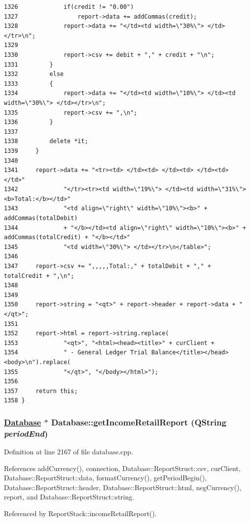 \begin{verbatim}
1326             if(credit != "0.00")
1327                 report->data += addCommas(credit);
1328             report->data += "</td><td width=\"30%\"> </td></tr>\n";
1329             
1330             report->csv += debit + "," + credit + "\n";
1331         }
1332         else
1333         {
1334             report->data += "</td><td width=\"10%\"> </td><td width=\"30%\"> </td></tr>\n";
1335             report->csv += ",\n";
1336         }
1337 
1338         delete *it;
1339     }
1340     
1341     report->data += "<tr><td> </td><td> </td><td> </td><td> </td>"
1342             "</tr><tr><td width=\"19%\"> </td><td width=\"31%\"><b>Total:</b></td>"
1343             "<td align=\"right\" width=\"10%\"><b>" + addCommas(totalDebit)
1344             + "</b></td><td align=\"right\" width=\"10%\"><b>" + addCommas(totalCredit) + "</b></td>"
1345             "<td width=\"30%\"> </td></tr>\n</table>";
1346 
1347     report->csv += ",,,,,Total:," + totalDebit + "," + totalCredit + ",\n";
1348     
1349     
1350     report->string = "<qt>" + report->header + report->data + "</qt>";
1351     
1352     report->html = report->string.replace(
1353             "<qt>", "<html><head><title>" + curClient +
1354             " - General Ledger Trial Balance</title></head><body>\n").replace(
1355             "</qt>", "</body></html>");
1356     
1357     return this;
1358 }
\end{verbatim}\normalsize 


\hypertarget{classDatabase_a28}{
\subsubsection[getIncomeRetailReport]{\setlength{\rightskip}{0pt plus 5cm}\hyperlink{classDatabase}{Database} $\ast$ Database::get\-Income\-Retail\-Report (QString {\em period\-End})}}
\label{classDatabase_a28}


Definition at line 2167 of file database.cpp.

References add\-Currency(), connection, Database::Report\-Struct::csv, cur\-Client, Database::Report\-Struct::data, format\-Currency(), get\-Period\-Begin(), Database::Report\-Struct::header, Database::Report\-Struct::html, neg\-Currency(), report, and Database::Report\-Struct::string.

Referenced by Report\-Stack::income\-Retail\-Report().

